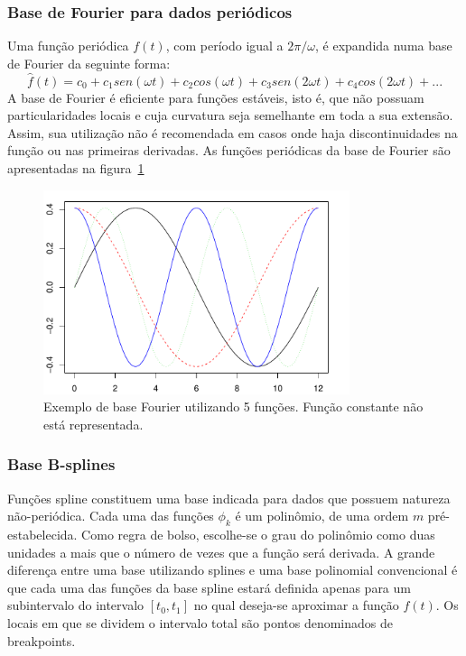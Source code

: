 \documentclass[
	12pt,				%
	openright,			%
	oneside,			%
	a4paper,			%
	english,			%
	brazil				%
	]{dissertacao-ufrgs-abntex2}
\begin{document}
\subsubsection*{Base de Fourier para dados periódicos}

Uma função periódica $f(t)$, com período igual a $2\pi/\omega$,
é expandida numa base de Fourier da seguinte forma:
\begin{equation}
\hat{f}(t)=c_{0}+c_{1}sen(\omega t)+c_{2}cos(\omega t)+c_{3}sen(2\omega t)+c_{4}cos(2\omega t)+...
\end{equation}
A base de Fourier é eficiente para funções estáveis, isto é, que não
possuam particularidades locais e cuja curvatura seja semelhante em
toda a sua extensão. Assim, sua utilização não é recomendada em casos
onde haja discontinuidades na função ou nas primeiras derivadas. As funções periódicas da base de Fourier são apresentadas na figura~\ref{fig-base-fourier}
\begin{figure}[h!] 
  \centering
    \includegraphics[width=0.8\textwidth]{anexos/base_fourier}
  \caption{Exemplo de base Fourier utilizando 5 funções. Função constante não está representada.}
  \label{fig-base-fourier}
\end{figure}

\subsubsection*{Base B-splines} \label{sub:Base-B-splines}

Funções spline constituem uma base indicada para  dados que possuem natureza não-periódica. 
Cada uma das funções $\phi_k$ é um polinômio, de uma ordem $m$ pré-estabelecida. 
Como regra de bolso, escolhe-se o grau do polinômio como duas unidades a mais que o número de vezes que a função será derivada.
A grande diferença entre uma base utilizando splines e uma base polinomial convencional é que cada uma das funções da base spline estará definida apenas para um subintervalo do intervalo $[t_0,t_1]$ no qual  deseja-se aproximar a função $f(t)$.
Os locais em que se dividem o intervalo total são pontos denominados de breakpoints.
\end{document}
